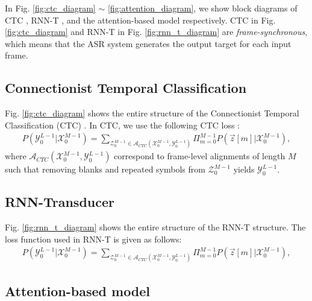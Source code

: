 \documentclass{article}
\begin{document}
 In Fig. 
\ref{fig:ctc_diagram} $\sim$ \ref{fig:attention_diagram}, we show
block diagrams of CTC \cite{a_graves_icml_2006_00}, 
RNN-T \cite{a_graves_corr_2012_00, a_graves_icassp_2013_00}, and 
the attention-based model 
\cite{
j_chorowski_nips_2015_00,
w_chan_icassp_2016_00} respectively. CTC in Fig. \ref{fig:ctc_diagram} 
and RNN-T in Fig. \ref{fig:rnn_t_diagram} are {\it frame-synchronous}, 
which means that the ASR system generates the output target for each 
input frame.





\subsection{Connectionist Temporal Classification}
\label{sec:ctc}

Fig. \ref{fig:ctc_diagram} shows the entire structure of the 
Connectionist Temporal Classification (CTC) 
\cite{a_graves_icml_2006_00}. In CTC, we use the following CTC loss
\cite{a_graves_icml_2006_00, y_he_icassp_2019_00}:
\begin{align}
  P\left(\mathcal{Y}_{0}^{L-1} | \mathcal{X}_{0}^{M-1}\right) = 
    \sum_{\mathcal{Z}_{0}^{M-1} \in 
      \mathcal{A}_{CTC} 
        \left(\mathcal{X}_{0}^{M-1}, \mathcal{Y}_{0}^{L-1} \right)}
          \Pi_{m=0}^{M-1}
            P\left(\vec{z}[m] | \mathcal{X}_{0}^{M-1} \right),
\end{align}
where $\mathcal{A}_{CTC} \left(\mathcal{X}_{0}^{M-1}, 
\mathcal{Y}_{0}^{L-1} \right)$ correspond to frame-level alignments
of length $M$ such that removing blanks and repeated symbols from 
$\mathcal{Z}_{0}^{M-1}$ yields $\mathcal{Y}_{0}^{L-1}$.


\subsection{RNN-Transducer}
\label{sec:rnn_t}

Fig. \ref{fig:rnn_t_diagram} shows the entire structure of the  
RNN-T structure. The loss function used in RNN-T is given as follows:
\begin{align}
  P\left(\mathcal{Y}_{0}^{L-1} | \mathcal{X}_{0}^{M-1}\right) = 
    \sum_{\mathcal{Z}_{0}^{M-1} \in 
      \mathcal{A}_{CTC} 
        \left(\mathcal{X}_{0}^{M-1}, \mathcal{Y}_{0}^{L-1} \right)}
          \Pi_{m=0}^{M-1}
            P\left(\vec{z}[m] | \mathcal{X}_{0}^{M-1} \right),
\end{align}

\subsection{Attention-based model}
\label{sec:attention_based_model}
\end{document}
